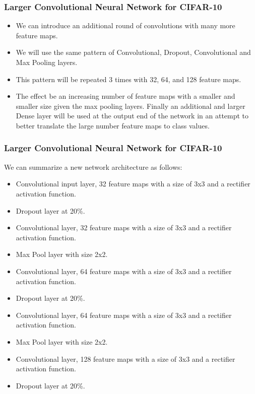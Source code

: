\begin{frame}[fragile] \frametitle{Larger Convolutional Neural Network for CIFAR-10}
\begin{itemize}
\item We can introduce an additional round of convolutions with many more feature maps. 
\item We will use the same pattern of Convolutional, Dropout, Convolutional and Max Pooling layers.
\item This pattern will be repeated 3 times with 32, 64, and 128 feature maps. 
\item The effect be an increasing number of feature maps with a smaller and smaller size given the max pooling layers. Finally an additional and larger Dense layer will be used at the output end of the network in an attempt to better translate the large number feature maps to class values.
\end{itemize}
\end{frame}

\begin{frame}[fragile] \frametitle{Larger Convolutional Neural Network for CIFAR-10}
We can summarize a new network architecture as follows:
\begin{itemize}
\item Convolutional input layer, 32 feature maps with a size of 3x3 and a rectifier activation function.
\item Dropout layer at 20\%.
\item Convolutional layer, 32 feature maps with a size of 3x3 and a rectifier activation function.
\item Max Pool layer with size 2x2.
\item Convolutional layer, 64 feature maps with a size of 3x3 and a rectifier activation function.
\item Dropout layer at 20\%.
\item Convolutional layer, 64 feature maps with a size of 3x3 and a rectifier activation function.
\item Max Pool layer with size 2x2.
\item Convolutional layer, 128 feature maps with a size of 3x3 and a rectifier activation function.
\item Dropout layer at 20\%.
\end{itemize}
\end{frame}


